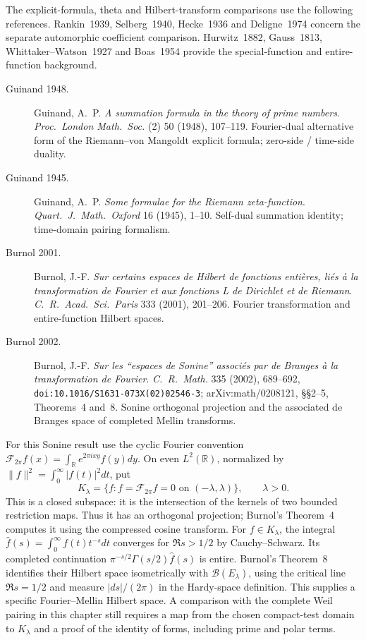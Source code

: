 The explicit-formula, theta and Hilbert-transform comparisons use
the following references. Rankin~1939, Selberg~1940, Hecke~1936 and
Deligne~1974 concern the separate automorphic coefficient comparison.
Hurwitz~1882, Gauss~1813, Whittaker--Watson~1927 and Boas~1954
provide the special-function and entire-function background.

\begin{description}
\item[Guinand 1948.] Guinand, A.~P. \emph{A summation formula in the
theory of prime numbers}. \emph{Proc.~London Math.~Soc.} (2) 50
(1948), 107--119. Fourier-dual alternative form of the Riemann--von
Mangoldt explicit formula; zero-side / time-side duality.
\item[Guinand 1945.] Guinand, A.~P. \emph{Some formulae for the
Riemann zeta-function}. \emph{Quart.~J.~Math.~Oxford} 16 (1945),
1--10. Self-dual summation identity; time-domain pairing formalism.
\item[Burnol 2001.] Burnol, J.-F. \emph{Sur certains espaces de
Hilbert de fonctions enti\`eres, li\'es \`a la transformation de Fourier
et aux fonctions L de Dirichlet et de Riemann}.
\emph{C.~R.~Acad.~Sci.~Paris} 333 (2001), 201--206.
Fourier transformation and entire-function Hilbert spaces.
\item[Burnol 2002.] Burnol, J.-F. \emph{Sur les ``espaces de Sonine''
associ\'es par de Branges \`a la transformation de Fourier}.
\emph{C.~R.~Math.} 335 (2002), 689--692,
\texttt{doi:10.1016/S1631-073X(02)02546-3}; arXiv:math/0208121,
\S\S2--5, Theorems~4 and~8. Sonine orthogonal projection and the
associated de Branges space of completed Mellin transforms.
\end{description}

For this Sonine result use the cyclic Fourier convention
$\mathcal F_{2\pi}f(x)=\int_{\mathbb R}e^{2\pi ixy}f(y)dy$.
On even $L^2(\mathbb R)$, normalized by
$\|f\|^2=\int_0^\infty|f(t)|^2dt$, put
\[
 K_\lambda=\{f:f=\mathcal F_{2\pi}f=0
                   \text{ on }(-\lambda,\lambda)\},\qquad\lambda>0.
\]
This is a closed subspace: it is the intersection of the kernels
of two bounded restriction maps. Thus it has an orthogonal
projection; Burnol's Theorem~4 computes it using the compressed
cosine transform. For $f\in K_\lambda$, the integral
$\widehat f(s)=\int_0^\infty f(t)t^{-s}dt$ converges for $\Re s>1/2$
by Cauchy--Schwarz. Its completed continuation
$\pi^{-s/2}\Gamma(s/2)\widehat f(s)$ is entire.
Burnol's Theorem~8 identifies their Hilbert space isometrically
with $\mathcal B(E_\lambda)$, using the critical line
$\Re s=1/2$ and measure $|ds|/(2\pi)$ in the Hardy-space definition.
This supplies a specific Fourier--Mellin Hilbert space.
A comparison with the complete Weil pairing in this chapter still
requires a map from the chosen compact-test domain to $K_\lambda$
and a proof of the identity of forms, including prime and polar terms.

